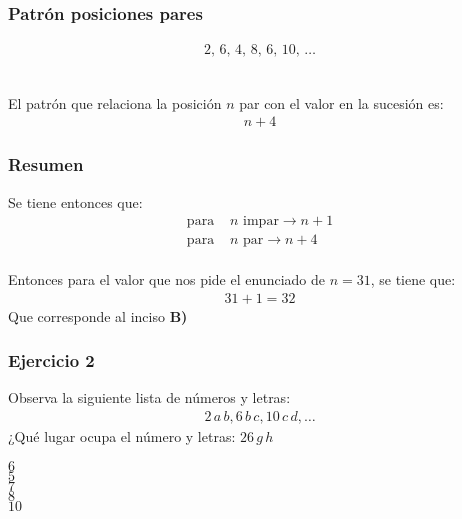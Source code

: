 \begin{frame}
\frametitle{Patrón posiciones pares}
\begin{align*}
2, \, 6, \, 4, \, 8, \, 6, \, 10, \, \ldots
\end{align*}
\\
\bigskip
\pause
El patrón que relaciona la posición $n$ par con el valor en la sucesión es:
\pause
\begin{align*}
n + 4
\end{align*}
\end{frame}
\begin{frame}
\frametitle{Resumen}
Se tiene entonces que:
\begin{align*}
\mbox{para } &n \mbox{ impar} \rightarrow n + 1 \\[0.5em]
\mbox{para } &n \mbox{ par} \rightarrow n + 4
\end{align*}
\\
\bigskip
\pause
Entonces para el valor que nos pide el enunciado de $n = 31$, se tiene que:
\pause
\begin{align*}
31 + 1 = 32
\end{align*}
Que corresponde al inciso \textbf{B)}
\end{frame}
\begin{frame}
\frametitle{Ejercicio 2}
Observa la siguiente lista de números y letras:
\begin{align*}
2 \, a \,  b, 6 \, b \, c, 10 \, c \, d, \ldots
\end{align*}
¿Qué lugar ocupa el número y letras: $26 \, g \, h$
\begin{choices}
\choice $6$ \\
\choice $5$ \\
\choice $7$ \\
\choice $8$ \\
\choice $10$
\end{choices}
\pause
{}
\end{frame}
